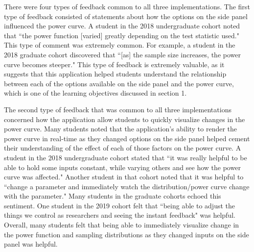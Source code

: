 \documentclass{TISE}
\begin{document}
There were four types of feedback common to all three implementations. The first type of feedback consisted of statements about how the options on the side panel influenced the power curve. A student in the 2018 undergraduate cohort noted that ``the power function [varied] greatly depending on the test statistic used."  This type of comment was extremely common. For example, a student in the 2018 graduate cohort discovered that ``[as] the sample size increases, the power curve becomes steeper." This type of feedback is extremely valuable, as it suggests that this application helped students understand the relationship between each of the options available on the side panel and the power curve, which is one of the learning objectives discussed in section 1. 

The second type of feedback that was common to all three implementations concerned how the application allow students to quickly visualize changes in the power curve. Many students noted that the application's ability to render the power curve in real-time as they changed options on the side panel helped cement their understanding of the effect of each of those factors on the power curve. A student in the 2018 undergraduate cohort stated that ``it was really helpful to be able to hold some inputs constant, while varying others and see how the power curve was affected." Another student in that cohort noted that it was helpful to ``change a parameter and immediately watch the distribution/power curve change with the parameter." Many students in the graduate cohorts echoed this sentiment. One student in the 2019 cohort felt that ``being able to adjust the things we control as researchers and seeing the instant feedback" was helpful. Overall, many students felt that being able to immediately visualize change in the power function and sampling distributions as they changed inputs on the side panel was helpful. 
\end{document}

